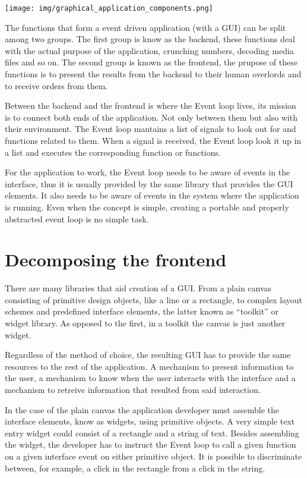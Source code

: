 \documentclass[12pt,a4paper,english]{book}
\begin{document}
{\hfill\texttt{[image: img/graphical\_application\_components.png]}\hfill}

The functions that form a event driven application (with a GUI) can be split
among two groups. The first group is know as the backend, these functions deal
with the actual purpose of the application, crunching numbers, decoding media
files and so on. The second group is known as the frontend, the prupose of
these functions is to present the results from the backend to their human
overlords and to receive orders from them.

Between the backend and the frontend is where the Event loop lives, its mission
is to connect both ends of the application. Not only between them but also with
their environment. The Event loop mantains a list of signals to look out for
and functions related to them. When a signal is received, the Event loop look
it up in a list and executes the corresponding function or functions.

For the application to work, the Event loop needs to be aware of events in the
interface, thus it is  usually provided by the same library that provides the
GUI elements. It also needs to be aware of events in the system where the
application is running. Even when the concept is simple, creating a portable
and properly abstracted event loop is no simple task.



\hypertarget{decomposing-the-frontend}{}
\section{Decomposing the frontend}
\label{decomposing-the-frontend}

There are many libraries that aid creation of a GUI. From a plain canvas
consisting of primitive design objects, like a line or a rectangle, to complex
layout schemes and predefined interface elements, the latter known as ``toolkit''
or widget library. As opposed to the first, in a toolkit the canvas is just
another widget.

Regardless of the method of choice, the resulting GUI has to provide the same
resources to the rest of the application. A mechanism to present information
to the user, a mechanism to know when the user interacts with the interface and
a mechanism to retreive information that resulted from said interaction.

In the case of the plain canvas the application developer must assemble the
interface elements, know as widgets, using primitive objects. A very simple
text entry widget could consist of a rectangle and a string of text. Besides
assembling the widget, the developer has to instruct the Event loop  to call a
given function on a given interface event on either primitive object. It is
possible to discriminate between, for example, a click in the rectangle from a
click in the string.
\end{document}
